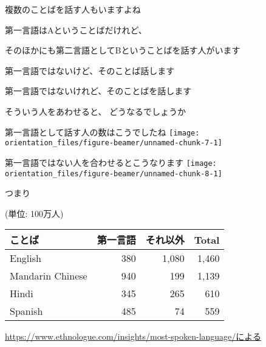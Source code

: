 \documentclass[
  ignorenonframetext,
  aspectratio=169,
  xcolor=dvipsnames]{beamer}
\begin{document}
\begin{frame}{複数のことばを話す人もいますよね}
\label{ux8907ux6570ux306eux3053ux3068ux3070ux3092ux8a71ux3059ux4ebaux3082ux3044ux307eux3059ux3088ux306d}
\Large

第一言語はAということばだけれど、

そのほかにも第二言語としてBということばを話す人がいます
\end{frame}

\begin{frame}{第一言語ではないけど、そのことば話します}
\label{ux7b2cux4e00ux8a00ux8a9eux3067ux306fux306aux3044ux3051ux3069ux305dux306eux3053ux3068ux3070ux8a71ux3057ux307eux3059}
\Large

第一言語ではないけれど、そのことばを話します

そういう人をあわせると、 どうなるでしょうか
\end{frame}

\begin{frame}{第一言語として話す人の数はこうでしたね}
\label{ux7b2cux4e00ux8a00ux8a9eux3068ux3057ux3066ux8a71ux3059ux4ebaux306eux6570ux306fux3053ux3046ux3067ux3057ux305fux306d}
\texttt{[image: orientation\_files/figure-beamer/unnamed-chunk-7-1]}
\end{frame}

\begin{frame}{第一言語ではない人を合わせるとこうなります}
\label{ux7b2cux4e00ux8a00ux8a9eux3067ux306fux306aux3044ux4ebaux3092ux5408ux308fux305bux308bux3068ux3053ux3046ux306aux308aux307eux3059}
\texttt{[image: orientation\_files/figure-beamer/unnamed-chunk-8-1]}
\end{frame}

\begin{frame}{つまり}
\label{ux3064ux307eux308a}
\raggedleft

(単位: 100万人)

\vfill

\Large

\begin{tabular}{lrrr}
\toprule
ことば & 第一言語 & それ以外 & Total\\
\midrule
English & 380 & 1,080 & 1,460\\
Mandarin Chinese & 940 & 199 & 1,139\\
Hindi & 345 & 265 & 610\\
Spanish & 485 & 74 & 559\\
\bottomrule
\end{tabular}

\vfill

\scriptsize

\url{https://www.ethnologue.com/insights/most-spoken-language/による}
\end{frame}
\end{document}
